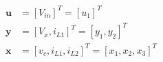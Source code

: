 
\begin{align*}
  \tag{Entradas del sistema}
  \textbf{u} &= \left[ V_{in} \right]^T  = [u_1]^T \\
  \tag{Saildas del sistema}
  \textbf{y} &= \left[ V_x, i_{L1} \right]^T = [y_1, y_2]^T \\
  \tag{Estados del sistema}
  \textbf{x} &= \left[ v_c, i_{L1}, i_{L2} \right]^T = [x_1, x_2, x_3]^T
\end{align*}
